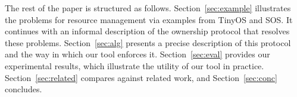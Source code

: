 The rest of the paper is structured as follows.
Section~\ref{sec:example} illustrates the problems for resource
management via examples from TinyOS and SOS.  It continues
with an informal description of the ownership protocol that resolves
these problems.  Section~\ref{sec:alg} presents a precise description
of this protocol and the way in which our tool enforces it.
Section~\ref{sec:eval} provides our experimental results, which
illustrate the utility of our tool in practice.
Section~\ref{sec:related} compares against related work, and
Section~\ref{sec:conc} concludes.

